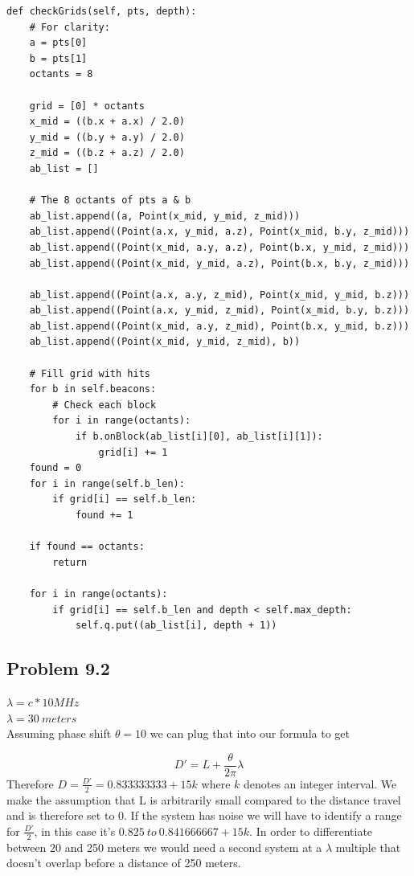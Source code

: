 \documentclass{article}
\begin{document}
\newpage
\begin{verbatim}
def checkGrids(self, pts, depth):
    # For clarity:
    a = pts[0]
    b = pts[1]
    octants = 8

    grid = [0] * octants
    x_mid = ((b.x + a.x) / 2.0)
    y_mid = ((b.y + a.y) / 2.0)
    z_mid = ((b.z + a.z) / 2.0)
    ab_list = []

    # The 8 octants of pts a & b
    ab_list.append((a, Point(x_mid, y_mid, z_mid)))
    ab_list.append((Point(a.x, y_mid, a.z), Point(x_mid, b.y, z_mid)))
    ab_list.append((Point(x_mid, a.y, a.z), Point(b.x, y_mid, z_mid)))
    ab_list.append((Point(x_mid, y_mid, a.z), Point(b.x, b.y, z_mid)))

    ab_list.append((Point(a.x, a.y, z_mid), Point(x_mid, y_mid, b.z)))
    ab_list.append((Point(a.x, y_mid, z_mid), Point(x_mid, b.y, b.z)))
    ab_list.append((Point(x_mid, a.y, z_mid), Point(b.x, y_mid, b.z)))
    ab_list.append((Point(x_mid, y_mid, z_mid), b))

    # Fill grid with hits
    for b in self.beacons:
        # Check each block
        for i in range(octants):
            if b.onBlock(ab_list[i][0], ab_list[i][1]):
                grid[i] += 1
    found = 0
    for i in range(self.b_len):
        if grid[i] == self.b_len:
            found += 1

    if found == octants:
        return

    for i in range(octants):
        if grid[i] == self.b_len and depth < self.max_depth:
            self.q.put((ab_list[i], depth + 1))
\end{verbatim}


\newpage
\subsection{Problem 9.2}
\noindent $\lambda = c * 10 MHz$\\
$\lambda = 30\ meters$\\


Assuming phase shift $\theta = 10$ we can plug that into our formula to get

$$D' = L + \frac{\theta}{2\pi}\lambda$$
Therefore $D = \frac{D'}{2} = 0.833333333 + 15k$ where $k$ denotes an integer 
interval. We make the assumption that L is arbitrarily small compared to the 
distance travel and is therefore set to $0$. If the system has noise we will 
have to identify a range for $\frac{D'}{2}$, in this case it's $0.825\ to\ 
0.841666667 + 15k$. In order to differentiate between 20 and 250 meters we would 
need a second system at a $\lambda$ multiple that doesn't overlap before a 
distance of 250 meters.
\end{document}
